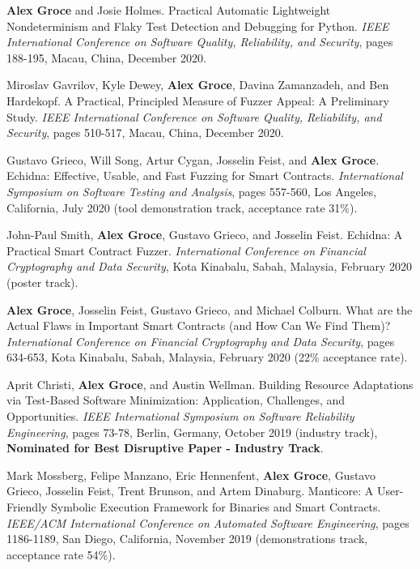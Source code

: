 \documentclass[ComputerScience]{vita}
\begin{document}
\begin{vita}
\begin{Refereed Conference and Workshop Publications}
\item {\bf Alex Groce} and Josie Holmes.
\newblock Practical Automatic Lightweight Nondeterminism and
           Flaky Test Detection and Debugging for Python.
\newblock \emph{IEEE International Conference on Software
Quality, Reliability, and Security}, pages 188-195, Macau,
China, December 2020.
  
\item Miroslav Gavrilov, Kyle Dewey, {\bf Alex Groce}, Davina Zamanzadeh,
  and Ben Hardekopf.
\newblock A Practical, Principled Measure of Fuzzer Appeal: A
Preliminary Study.
\newblock \emph{IEEE International Conference on Software
Quality, Reliability, and Security}, pages 510-517, Macau,
China, December 2020.
  
\item Gustavo Grieco, Will Song, Artur Cygan, Josselin Feist, and {\bf
    Alex Groce}.
\newblock Echidna: Effective, Usable, and Fast Fuzzing for Smart Contracts.
\newblock \emph{International Symposium on Software Testing and
  Analysis}, pages 557-560, Los Angeles, California, July
2020 (tool demonstration track, acceptance rate 31\%).
  
\item John-Paul Smith, {\bf Alex Groce}, Gustavo Grieco, and Josselin Feist.
\newblock Echidna: A Practical Smart Contract Fuzzer.
\newblock \emph{International Conference on Financial Cryptography and
  Data Security}, Kota Kinabalu, Sabah,
Malaysia, February 2020 (poster track).
  
\item {\bf Alex Groce}, Josselin Feist, Gustavo Grieco, and Michael Colburn. 
\newblock What are the Actual
Flaws in Important Smart Contracts (and How Can We Find Them)?
\newblock \emph{International Conference on Financial Cryptography and
  Data Security}, pages 634-653, Kota Kinabalu, Sabah, Malaysia, February 2020
(22\% acceptance rate).

\item Aprit Christi, {\bf Alex Groce}, and Austin Wellman.
\newblock Building Resource Adaptations via Test-Based Software
Minimization: Application, Challenges, and Opportunities.
\newblock \emph{IEEE International Symposium on Software Reliability 
  Engineering}, pages 73-78, Berlin, Germany, October
2019 (industry track), {\bf Nominated for Best Disruptive Paper - Industry Track}.
  
\item Mark Mossberg, Felipe Manzano, Eric Hennenfent, {\bf Alex
    Groce}, Gustavo Grieco, Josselin Feist, Trent Brunson, and Artem Dinaburg.
\newblock Manticore: A User-Friendly Symbolic Execution Framework for Binaries and Smart Contracts.
\newblock \emph{IEEE/ACM International Conference on Automated Software
  Engineering}, pages 1186-1189, San Diego, California,
November 2019 (demonstrations track, acceptance rate 54\%).
  

\end{Refereed Conference and Workshop Publications}
\end{vita}
\end{document}
